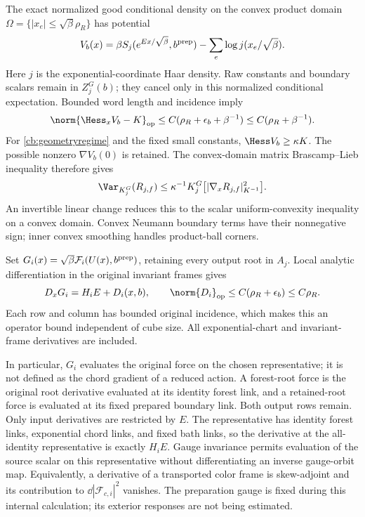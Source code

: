 The exact normalized good conditional density on the convex product domain \(\Omega=\{|x_e|\le\sqrt\beta\rho_R\}\) has potential
\begin{equation}
 V_b(x)=\beta S_j(e^{Ex/\sqrt\beta},b^{\rm prep})
                   -\sum_e\log j(x_e/\sqrt\beta).
 \label{cb:potential}
\end{equation}
Here \(j\) is the exponential-coordinate Haar density. Raw constants and boundary scalars remain in \(Z_j^G(b)\); they cancel only in this normalized conditional expectation. Bounded word length and incidence imply
\[
 \norm{\Hess_xV_b-K}_{\rm op}
 \le C(\rho_R+\epsilon_b+\beta^{-1})
 \le C(\rho_R+\beta^{-1}).
\]
For \eqref{cb:geometryregime} and the fixed small constants, \(\Hess V_b\ge\kappa K\). The possible nonzero \(\nabla V_b(0)\) is retained. The convex-domain matrix Brascamp--Lieb inequality therefore gives
\begin{equation}
 \Var_{K_j^G}(R_{j,f})
 \le\kappa^{-1}K_j^G\bigl[|\nabla_xR_{j,f}|_{K^{-1}}^2\bigr].
 \label{cb:BL}
\end{equation}
An invertible linear change reduces this to the scalar uniform-convexity inequality on a convex domain. Convex Neumann boundary terms have their nonnegative sign; inner convex smoothing handles product-ball corners.

Set \(G_i(x)=\sqrt\beta\mathcal F_i(U(x),b^{\rm prep})\), retaining every output root in \(A_j\). Local analytic differentiation in the original invariant frames gives
\begin{equation}
 D_xG_i=H_iE+D_i(x,b),\qquad
 \norm{D_i}_{\rm op}\le C(\rho_R+\epsilon_b)\le C\rho_R.
 \label{cb:forcegradient}
\end{equation}
Each row and column has bounded original incidence, which makes this an operator bound independent of cube size. All exponential-chart and invariant-frame derivatives are included.

In particular, \(G_i\) evaluates the original force on the chosen representative; it is not defined as the chord gradient of a reduced action. A forest-root force is the original root derivative evaluated at its identity forest link, and a retained-root force is evaluated at its fixed prepared boundary link. Both output rows remain. Only input derivatives are restricted by \(E\). The representative has identity forest links, exponential chord links, and fixed bath links, so the derivative at the all-identity representative is exactly \(H_iE\). Gauge invariance permits evaluation of the source scalar on this representative without differentiating an inverse gauge-orbit map. Equivalently, a derivative of a transported color frame is skew-adjoint and its contribution to \(\dd|\mathcal F_{c,i}|^2\) vanishes. The preparation gauge is fixed during this internal calculation; its exterior responses are not being estimated.

